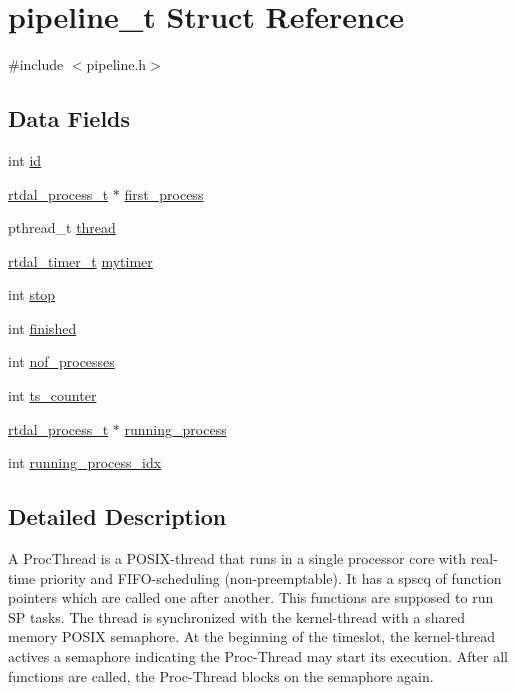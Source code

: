\hypertarget{structpipeline__t}{\section{pipeline\-\_\-t Struct Reference}
\label{structpipeline__t}
}


{\ttfamily \#include $<$pipeline.\-h$>$}

\subsection*{Data Fields}
\begin{DoxyCompactItemize}
\item 
int \hyperlink{structpipeline__t_a4d67080f7085c575d347d1ed5203a2ff}{id}
\item 
\hyperlink{rtdal__process_8h_aae6bdd48dcdbb9e74bbfb3dd6cd72b2a}{rtdal\-\_\-process\-\_\-t} $\ast$ \hyperlink{structpipeline__t_a6bb54a0cd8dde618972cdcd629503979}{first\-\_\-process}
\item 
pthread\-\_\-t \hyperlink{structpipeline__t_ab506a10f907e26976e2784e7b4d3075d}{thread}
\item 
\hyperlink{structrtdal__timer__t}{rtdal\-\_\-timer\-\_\-t} \hyperlink{structpipeline__t_ab49193f9dbfbddaee1b5327c2ece0fb8}{mytimer}
\item 
int \hyperlink{structpipeline__t_ab5d965c3c5c84d69165351e7d7b70e80}{stop}
\item 
int \hyperlink{structpipeline__t_a676e2ef00113a6da513d70007858628b}{finished}
\item 
int \hyperlink{structpipeline__t_af1260ecb0c7e3429f031708d1eebaf04}{nof\-\_\-processes}
\item 
int \hyperlink{structpipeline__t_ada6cb4fb46dcc2966c0237c2e24db1ed}{ts\-\_\-counter}
\item 
\hyperlink{rtdal__process_8h_aae6bdd48dcdbb9e74bbfb3dd6cd72b2a}{rtdal\-\_\-process\-\_\-t} $\ast$ \hyperlink{structpipeline__t_a8c842f2d27e3f3a3ff933d5a2ee409fa}{running\-\_\-process}
\item 
int \hyperlink{structpipeline__t_a09b2f4bb610224e4f5c9ddcbf81b7874}{running\-\_\-process\-\_\-idx}
\end{DoxyCompactItemize}


\subsection{Detailed Description}
A Proc\-Thread is a P\-O\-S\-I\-X-\/thread that runs in a single processor core with real-\/time priority and F\-I\-F\-O-\/scheduling (non-\/preemptable). It has a spscq of function pointers which are called one after another. This functions are supposed to run S\-P tasks. The thread is synchronized with the kernel-\/thread with a shared memory P\-O\-S\-I\-X semaphore. At the beginning of the timeslot, the kernel-\/thread actives a semaphore indicating the Proc-\/\-Thread may start its execution. After all functions are called, the Proc-\/\-Thread blocks on the semaphore again.

